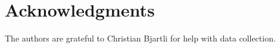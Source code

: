 \documentclass[sigconf]{acmart} %
\begin{document}
\maketitle

% 





\section*{Acknowledgments}
The authors are grateful to Christian Bjartli for help with data collection.


\end{document}
